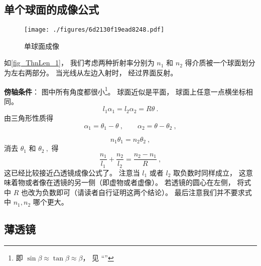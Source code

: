 


\subsection{单个球面的成像公式}
\begin{figure}[ht]
\centering
\texttt{[image: ./figures/6d2130f19ead8248.pdf]}
\caption{单球面成像} \label{fig_ThnLen_1}
\end{figure}

如\autoref{fig_ThnLen_1}， 我们考虑两种折射率分别为 $n_1$ 和 $n_2$ 得介质被一个球面划分为左右两部分。 当光线从左边入射时， 经过界面反射。

\textbf{傍轴条件}： 图中所有角度都很小\footnote{即 $\sin\beta \approx \tan\beta \approx \beta$， 见 “”}。 球面近似是平面， 球面上任意一点横坐标相同。
\begin{equation}
l_1 \alpha_1 = l_2 \alpha_2 = R\theta~.
\end{equation}
由三角形性质得
\begin{equation}
\alpha_1 = \theta_1 - \theta ~,\qquad
\alpha_2 = \theta - \theta_2~,
\end{equation}

\begin{equation}
n_1 \theta_1 = n_2 \theta_2~,
\end{equation}
消去 $\theta_1$ 和 $\theta_2~,$ 得
\begin{equation}
\frac{n_1}{l_1} + \frac{n_2}{l_2} = \frac{n_2 - n_1}{R}~,
\end{equation}
这已经比较接近凸透镜成像公式了。 注意当 $l_1$ 或者 $l_2$ 取负数时同样成立， 这意味着物或者像在透镜的另一侧（即虚物或者虚像）。 若透镜的圆心在左侧， 将式中 $R$ 也改为负数即可（请读者自行证明这两个结论）。 最后注意我们并不要求式中 $n_1, n_2$ 哪个更大。

\subsection{薄透镜}


